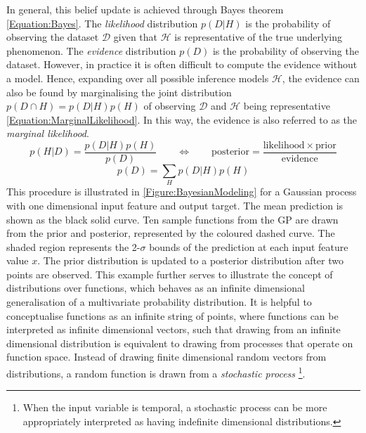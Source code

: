 			In general, this belief update is achieved through Bayes theorem \eqref{Equation:Bayes}. The \textit{likelihood} distribution $p(D | H)$ is the probability of observing the dataset $\mathcal{D}$ given that $\mathcal{H}$ is representative of the true underlying phenomenon. The \textit{evidence} distribution $p(D)$ is the probability of observing the dataset. However, in practice it is often difficult to compute the evidence without a model. Hence, expanding over all possible inference models $\mathcal{H}$, the evidence can also be found by marginalising the joint distribution $p(D \cap H) = p(D | H) p(H)$ of observing $\mathcal{D}$ and $\mathcal{H}$ being representative \eqref{Equation:MarginalLikelihood}. In this way, the evidence is also referred to as the \textit{marginal likelihood}. \begin{equation}
				p(H | D) = \frac{p(D | H) p(H)}{p(D)} \qquad \Longleftrightarrow \qquad \mathrm{posterior} = \frac{\mathrm{likelihood} \times \mathrm{prior}}{\mathrm{evidence}}
			\label{Equation:Bayes}
			\end{equation} \begin{equation}
				p(D) = \sum_{H} p(D | H) p(H)
			\label{Equation:MarginalLikelihood}
			\end{equation} This procedure is illustrated in \cref{Figure:BayesianModeling} for a Gaussian process with one dimensional input feature and output target. The mean prediction is shown as the black solid curve. Ten sample functions from the GP are drawn from the prior and posterior, represented by the coloured dashed curve. The shaded region represents the 2-$\sigma$ bounds of the prediction at each input feature value $x$. The prior distribution is updated to a posterior distribution after two points are observed. This example further serves to illustrate the concept of distributions over functions, which behaves as an infinite dimensional generalisation of a multivariate probability distribution. It is helpful to conceptualise functions as an infinite string of points, where functions can be interpreted as infinite dimensional vectors, such that drawing from an infinite dimensional distribution is equivalent to drawing from processes that operate on function space. Instead of drawing finite dimensional random vectors from distributions, a random function is drawn from a \textit{stochastic process} \footnote{When the input variable is temporal, a stochastic process can be more appropriately interpreted as having indefinite dimensional distributions.}.
			
